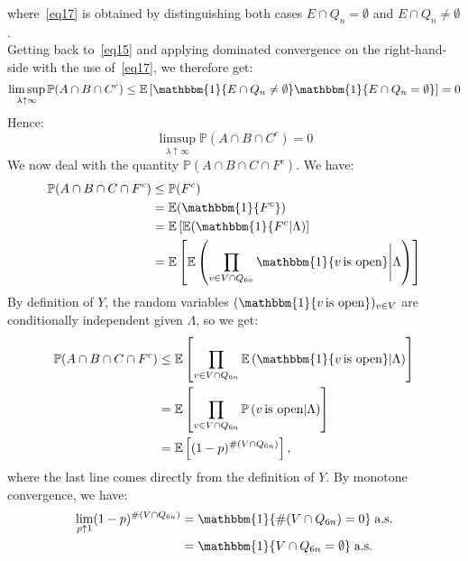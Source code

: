\documentclass[10pt,a4paper]{amsart}
\theoremstyle{exampstyle}
\theoremstyle{exampnotations}
\begin{document}
where~\eqref{eq17} is obtained by distinguishing both cases $E \cap Q_n = \emptyset$ and $E \cap Q_n \neq \emptyset$. \\
Getting back to~\eqref{eq15} and applying dominated convergence on the right-hand-side with the use of~\eqref{eq17}, we therefore get:
\begin{equation*}
  \limsup_{\lambda \uparrow \infty} \mathbb{P}(A \cap B \cap C^c) \leq \mathbb{E}\left[\mathbbm{1}\lbrace E \cap Q_n \neq \emptyset \rbrace \mathbbm{1} \lbrace E \cap Q_n = \emptyset \rbrace \right] = 0  
\end{equation*}
Hence:
\begin{equation}
    \label{eq18}
    \limsup_{\lambda \uparrow \infty} \mathbb{P}(A \cap B \cap C^c) = 0
\end{equation}
We now deal with the quantity $\mathbb{P}(A \cap B \cap C \cap F^c)$. We have:
\begin{align*}
    \mathbb{P}(A \cap B \cap C \cap F^c) &\leq \mathbb{P}(F^{c})
    \\ &= \mathbb{E}(\mathbbm{1}\lbrace F^c \rbrace)
    \\ &= \mathbb{E}\left[\mathbb{E}(\mathbbm{1}\lbrace F^c \vert \Lambda ) \right]
    \\ &= \mathbb{E}\left[\mathbb{E}\left( \prod_{v \in V \cap Q_{6n}} \mathbbm{1}\lbrace v \, \text{is open} \rbrace \Bigg\vert \Lambda \right)\right]
\end{align*}
By definition of $Y$, the random variables $(\mathbbm{1} \lbrace v \, \text{is open} \rbrace )_{v \in V}$ are conditionally independent given $\Lambda$, so we get:
\begin{align}
    \nonumber \mathbb{P}(A \cap B \cap C \cap F^c) &\leq \mathbb{E}\left[\prod_{v \in V \cap Q_{6n}}\mathbb{E}\left( \mathbbm{1}\lbrace v \, \text{is open} \rbrace \vert \Lambda \right)\right]
    \\ \nonumber &= \mathbb{E}\left[\prod_{v \in V \cap Q_{6n}}\mathbb{P}\left( v \, \text{is open} \vert \Lambda \right)\right]
    \\ \label{eq19} &= \mathbb{E}\left[(1-p)^{\#(V \cap Q_{6n})}\right], 
\end{align}
where the last line comes directly from the definition of $Y$. By monotone convergence, we have:
\begin{align*}
  \lim_{p \uparrow 1}(1-p)^{\#(V \cap Q_{6n})} &= \mathbbm{1}\lbrace \#(V \cap Q_{6n}) = 0 \rbrace \; \text{a.s.}
  \\ &= \mathbbm{1}\lbrace V \cap Q_{6n} = \emptyset \rbrace \; \text{a.s.}  
\end{align*}
\end{document}
